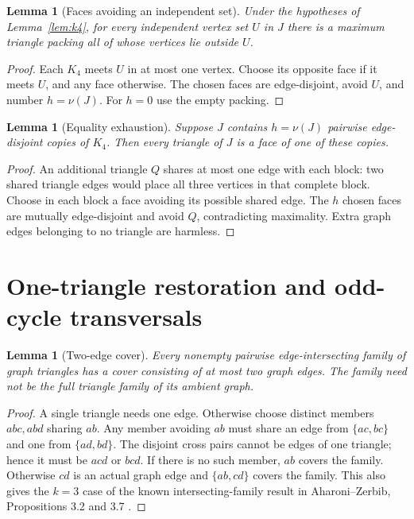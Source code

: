 \documentclass[11pt]{article}
\newtheorem{lemma}[theorem]{Lemma}
\theoremstyle{definition}\newtheorem{definition}[theorem]{Definition}
\theoremstyle{remark}\newtheorem{remark}[theorem]{Remark}
\begin{document}
\begin{lemma}[Faces avoiding an independent set]\label{lem:faces}
Under the hypotheses of Lemma~\ref{lem:k4}, for every independent vertex
set $U$ in $J$ there is a maximum triangle packing all of whose vertices
lie outside $U$.
\end{lemma}
\begin{proof}\leavevmode
Each $K_4$ meets $U$ in at most one vertex. Choose its opposite face if
it meets $U$, and any face otherwise. The chosen faces are edge-disjoint,
avoid $U$, and number $h=\nu(J)$. For $h=0$ use the empty packing.
\end{proof}


\begin{lemma}[Equality exhaustion]\label{lem:exhaustion}
Suppose $J$ contains $h=\nu(J)$ pairwise edge-disjoint copies of $K_4$. Then every triangle of $J$ is a face of one of these copies.
\end{lemma}
\begin{proof}\leavevmode
An additional triangle $Q$ shares at most one edge with each block: two shared triangle edges would place all three vertices in that complete block. Choose in each block a face avoiding its possible shared edge. The $h$ chosen faces are mutually edge-disjoint and avoid $Q$, contradicting maximality. Extra graph edges belonging to no triangle are harmless.
\end{proof}

\section{One-triangle restoration and odd-cycle transversals}

\begin{lemma}[Two-edge cover]\label{lem:intersecting}
Every nonempty pairwise edge-intersecting family of graph triangles has
a cover consisting of at most two graph edges. The family need not be
the full triangle family of its ambient graph.
\end{lemma}
\begin{proof}\leavevmode
A single triangle needs one edge. Otherwise choose distinct members
$abc,abd$ sharing $ab$. Any member avoiding $ab$ must share an edge from
$\{ac,bc\}$ and one from $\{ad,bd\}$. The disjoint cross pairs cannot
be edges of one triangle; hence it must be $acd$ or $bcd$.
If there is no such member, $ab$ covers the family. Otherwise $cd$ is
an actual graph edge and $\{ab,cd\}$ covers the family.
This also gives the $k=3$ case of the known intersecting-family result
in Aharoni--Zerbib, Propositions 3.2 and 3.7 \cite{AZ}.
\end{proof}
\end{document}

